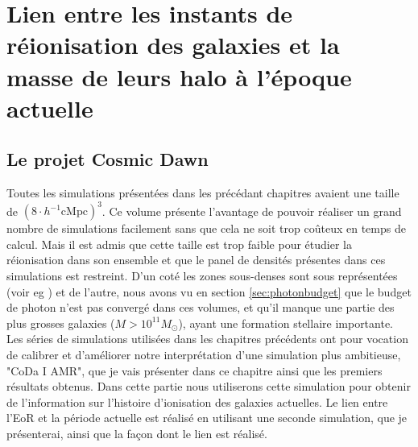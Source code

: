 \chapter{Lien entre les instants de réionisation des galaxies et la masse de leurs halo à l'époque actuelle}

\section{Le projet Cosmic Dawn}
\label{sec:CODAEMMA}

Toutes les simulations présentées dans les précédant chapitres avaient une taille de $\left( 8\cdot h^{-1} \mathrm{cMpc} \right)^3$.
Ce volume présente l'avantage de pouvoir réaliser un grand nombre de simulations facilement sans que cela ne soit trop coûteux en temps de calcul.
Mais il est admis que cette taille est trop faible pour étudier la réionisation dans son ensemble et que le panel de densités présentes dans ces simulations est restreint.
D'un coté les zones sous-denses sont sous représentées  (voir eg \cite{iliev_simulating_2006}) et de l'autre, nous avons vu en section \ref{sec:photonbudget} que le budget de photon n'est pas convergé dans ces volumes, et qu'il manque une partie des plus grosses galaxies ($M>10^{11}M_\odot$), ayant une formation stellaire importante.
Les séries de simulations utilisées dans les chapitres précédents ont pour vocation de calibrer et d'améliorer notre interprétation d'une simulation plus ambitieuse, "\ac{CoDa} I AMR", que je vais présenter dans ce chapitre ainsi que les premiers résultats obtenus.
Dans cette partie nous utiliserons cette simulation pour obtenir de l'information sur l'histoire d'ionisation des galaxies actuelles.
Le lien entre l'\ac{EoR} et la période actuelle est réalisé en utilisant une seconde simulation, que je présenterai, ainsi que la façon dont le lien est réalisé.



